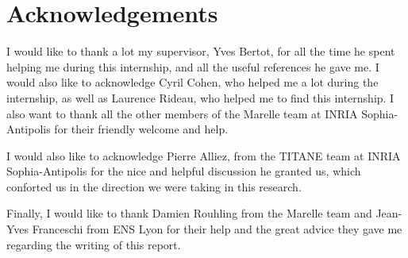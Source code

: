 \documentclass[a4paper,10pt]{article}
\begin{document}
\section{Acknowledgements}
I would like to thank a lot my supervisor, Yves Bertot, for all the time he spent helping me during this internship, and all the useful references he gave me. I would also like to acknowledge Cyril Cohen, who helped me a lot during the internship, as well as Laurence Rideau, who helped me to find this internship. I also want to thank all the other members of the Marelle team at INRIA Sophia-Antipolis for their friendly welcome and help.

I would also like to acknowledge Pierre Alliez, from the TITANE team at INRIA Sophia-Antipolis for the nice and helpful discussion he granted us, which conforted us in the direction we were taking in this research.

Finally, I would like to thank Damien Rouhling from the Marelle team and Jean-Yves Franceschi from ENS Lyon for their help and the great advice they gave me regarding the writing of this report.

\newpage


\end{document}
